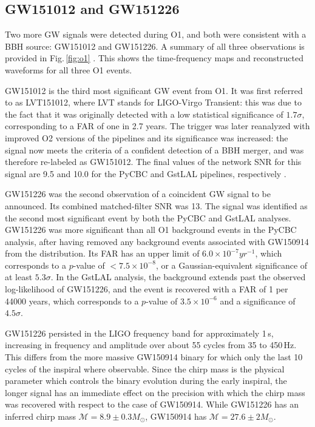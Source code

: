 \documentclass[binding=0.6cm, LaM]{sapthesis}
\begin{document}
\subsection{GW151012 and GW151226}

	Two more GW signals were detected during O1, and both were consistent with a BBH source: 
	GW151012 and GW151226.  
	A summary of all three observations is provided in Fig.\,\ref{fig:o1} \cite{13}.  
	This shows the time-frequency maps and reconstructed waveforms for all three O1 events.

	GW151012 is the third most significant GW event from O1.  
	It was first referred to as LVT151012, where LVT stands for LIGO-Virgo Transient: 
	this was due to the fact that it was originally detected with a low statistical significance of $1.7\sigma$, 
	corresponding to a FAR of one in 2.7 years.  
	The trigger was later reanalyzed with improved O2 versions of the pipelines and its significance was increased: 
	the signal now meets the criteria of a confident detection of a BBH merger, 
	and was therefore re-labeled as GW151012.  
	The final values of the network SNR for this signal are 9.5 and 10.0 
	for the {\ttfamily PyCBC} and {\ttfamily GstLAL} pipelines, respectively \cite{13}.

	GW151226 was the second observation of a coincident GW signal to be announced. 
	Its combined matched-filter SNR was 13. 
	The signal was identified as the second most significant event by both the {\ttfamily PyCBC} and {\ttfamily GstLAL} analyses.
	GW151226 was more significant than all O1 background events in the {\ttfamily PyCBC} analysis, 
	after having removed any background events associated with GW150914 from the distribution.
	Its FAR has an upper limit of $6.0 \times 10^{-7} yr^{-1}$, which
        corresponds to a $p$-value of $< 7.5 \times 10^{-8}$, or a Gaussian-equivalent significance of at least $5.3\sigma$. 
	In the {\ttfamily GstLAL} analysis, the background extends past the observed log-likelihood of GW151226, 
	and the event is recovered with a FAR of 1 per 44000 years, which corresponds to a $p$-value of $3.5\times 10^{-6}$ and a significance of $4.5\sigma$.

	GW151226 persisted in the LIGO frequency band for approximately 1\,s, 
	increasing in frequency and amplitude over about 55 cycles from 35 to 450\,Hz. 
	This differs from the more massive GW150914 binary for which only the last 10 cycles of the inspiral where observable.  
	Since the chirp mass is the physical parameter which controls the binary evolution during the early inspiral, 
	the longer signal has an immediate effect on the precision 
	with which the chirp mass \cite{126, 127} was recovered with respect to the case of GW150914.
	While GW151226 has an inferred chirp mass $\mathcal{M}=8.9\pm 0.3 M_\odot$,
	GW150914 has $\mathcal{M}=27.6\pm 2  M_\odot$.
\end{document}
